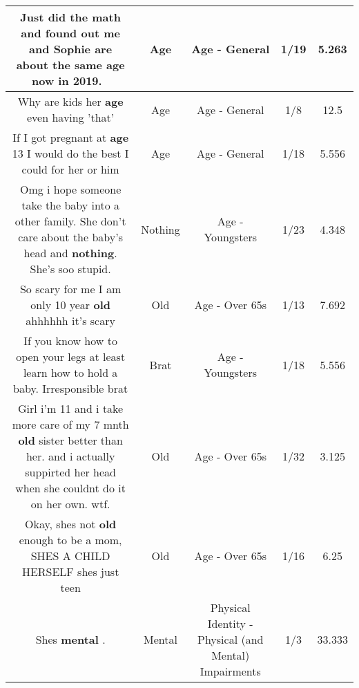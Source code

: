 \documentclass[11pt]{article}
\newlength\mylength
\begin{document}
\begin{center}
\begin{longtable}{|C{.65\mylength}|C{.30\mylength}|C{.12\mylength}|C{.12\mylength}|C{.12\mylength}|}
  \small Just did the math and found out me and Sophie are about the same \textbf{age} now in 2019. 👀\normalsize   & Age & Age - General & 1/19 & 5.263 \\  \hline
  \small Why are kids her \textbf{age} even having 'that'\normalsize   & Age & Age - General & 1/8 & 12.5 \\  \hline
  \small If I got pregnant at \textbf{age} 13 I would do the best I could for her or him\normalsize   & Age & Age - General & 1/18 & 5.556 \\  \hline
  \small Omg i hope someone take the baby into a other family. She don't care about the baby's head and \textbf{nothing}. She's soo stupid.\normalsize   & Nothing & Age - Youngsters & 1/23 & 4.348 \\  \hline
  \small So scary for me I am only 10 year \textbf{old} ahhhhhh it's scary\normalsize   & Old & Age - Over 65s & 1/13 & 7.692 \\  \hline
  \small If you know how to open your legs at least learn how to hold a baby. Irresponsible brat\normalsize   & Brat & Age - Youngsters & 1/18 & 5.556 \\  \hline
  \small Girl i'm 11 and i take more care of my 7 mnth \textbf{old} sister better than her. and i actually suppirted her head when she couldnt do it on her own. wtf.\normalsize   & Old & Age - Over 65s & 1/32 & 3.125 \\  \hline
  \small Okay, shes not \textbf{old} enough to be a mom, SHES A CHILD HERSELF shes just teen\normalsize   & Old & Age - Over 65s & 1/16 & 6.25 \\  \hline
  \small Shes \textbf{mental} .\normalsize   & Mental & Physical Identity - Physical (and Mental) Impairments & 1/3 & 33.333 \\  \hline

\end{longtable}
\end{center}
\end{document}
